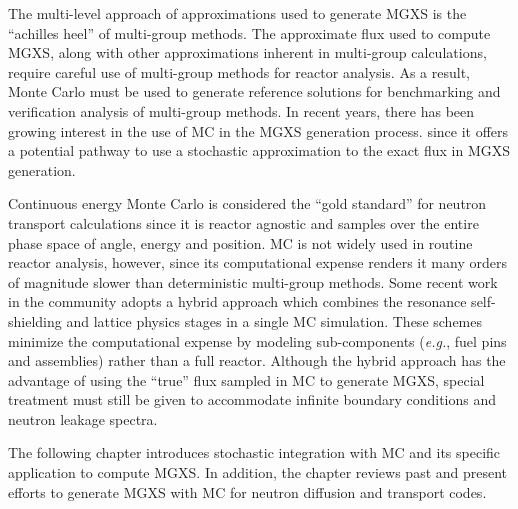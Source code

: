The multi-level approach of approximations used to generate \ac{MGXS} is the ``achilles heel'' of multi-group methods. The approximate flux used to compute \ac{MGXS}, along with other approximations inherent in multi-group calculations, require careful use of multi-group methods for reactor analysis. As a result, Monte Carlo must be used to generate reference solutions for benchmarking and verification analysis of multi-group methods. In recent years, there has been growing interest in the use of \ac{MC} in the \ac{MGXS} generation process\cite{leppanen2007serpent,fridman2011serpent,
leppanen2016overview,dorval2015diff,ilas2003monte,pounders2006stochastically,
pounders2009diffusion,pounders2015history,cho2009generation,yun2010monte,
yamamoto2012buckling,yamamoto2012diff,shim2008generation,park2010assembly,park2012generation,
herman2013improved,liuphysor2016,okumura2000validation,tohjoh2005application,
gast1981procedure,ondis2000rcp01,blomquist2002status,redmond1997multigroup,
van2006homogenized,hoogenboom2007generation,yoshioka2010multigroup, yoshioka2011multi,
cai2014condensation,nelson2014improved}. since it offers a potential pathway to use a stochastic approximation to the exact flux in \ac{MGXS} generation.

Continuous energy Monte Carlo is considered the ``gold standard'' for neutron transport calculations since it is reactor agnostic and samples over the entire phase space of angle, energy and position. \ac{MC} is not widely used in routine reactor analysis, however, since its computational expense renders it many orders of magnitude slower than deterministic multi-group methods. Some recent work in the community adopts a hybrid approach which combines the resonance self-shielding and lattice physics stages in a single \ac{MC} simulation. These schemes minimize the computational expense by modeling sub-components (\textit{e.g.}, fuel pins and assemblies) rather than a full reactor. Although the hybrid approach has the advantage of using the ``true'' flux sampled in \ac{MC} to generate \ac{MGXS}, special treatment must still be given to accommodate infinite boundary conditions and neutron leakage spectra.

The following chapter introduces stochastic integration with \ac{MC} and its specific application to compute \ac{MGXS}. In addition, the chapter reviews past and present efforts to generate \ac{MGXS} with \ac{MC} for neutron diffusion and transport codes.


